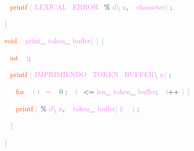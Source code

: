 \documentclass[8, usernames, dvipsnames]{beamer}
\begin{document}
\begin{frame}
\textcolor{White}{\   }
\textcolor{OrangeRed}{printf}
\textcolor{SkyBlue}{(}
\textcolor{Violet}{LEXICAL}\textcolor{White}{\ }
\textcolor{Violet}{ERROR}\textcolor{White}{\ }
\textcolor{Apricot}{\%}
\textcolor{Violet}{d}\textcolor{Gray}{\textbackslash }
\textcolor{Violet}{n}\textcolor{Sepia}{,}
\textcolor{White}{\ }
\textcolor{Violet}{character}\textcolor{SkyBlue}{)}
\textcolor{Sepia}{;}

 \textcolor{SkyBlue}{\} }

 \textcolor{OrangeRed}{void}
\textcolor{White}{\ }
\textcolor{Violet}{print}\textcolor{Sepia}{\_}
\textcolor{Violet}{token}\textcolor{Sepia}{\_}
\textcolor{Violet}{buffer}\textcolor{SkyBlue}{(}
\textcolor{SkyBlue}{)}
\textcolor{SkyBlue}{\{ }

 \textcolor{White}{\   }
\textcolor{OrangeRed}{int}
\textcolor{White}{\ }
\textcolor{Violet}{i}\textcolor{Sepia}{;}

 \textcolor{White}{\   }
\textcolor{OrangeRed}{printf}
\textcolor{SkyBlue}{(}
\textcolor{Violet}{IMPRIMIENDO}\textcolor{White}{\ }
\textcolor{Violet}{TOKEN}\textcolor{White}{\ }
\textcolor{Violet}{BUFFER}\textcolor{Gray}{\textbackslash }
\textcolor{Violet}{n}\textcolor{SkyBlue}{)}
\textcolor{Sepia}{;}

 \textcolor{White}{\   }
\textcolor{White}{\   }
\textcolor{OrangeRed}{for}
\textcolor{White}{\ }
\textcolor{SkyBlue}{(}
\textcolor{Violet}{i}\textcolor{White}{\ }
\textcolor{Salmon}{=}
\textcolor{White}{\ }
\textcolor{SeaGreen}{0}
\textcolor{Sepia}{;}
\textcolor{White}{\ }
\textcolor{Violet}{i}\textcolor{White}{\ }
\textcolor{OliveGreen}{\textless =}
\textcolor{Violet}{len}\textcolor{Sepia}{\_}
\textcolor{Violet}{token}\textcolor{Sepia}{\_}
\textcolor{Violet}{buffer}\textcolor{Sepia}{;}
\textcolor{White}{\ }
\textcolor{Violet}{i}\textcolor{Apricot}{++}
\textcolor{SkyBlue}{)}
\textcolor{SkyBlue}{\{ }

 \textcolor{White}{\   }
\textcolor{White}{\   }
\textcolor{OrangeRed}{printf}
\textcolor{SkyBlue}{(}
\textcolor{Apricot}{\%}
\textcolor{Violet}{d}\textcolor{Gray}{\textbackslash }
\textcolor{Violet}{n}\textcolor{Sepia}{,}
\textcolor{White}{\ }
\textcolor{Violet}{token}\textcolor{Sepia}{\_}
\textcolor{Violet}{buffer}\textcolor{SkyBlue}{[}
\textcolor{Violet}{i}\textcolor{SkyBlue}{]}
\textcolor{White}{\ }
\textcolor{SkyBlue}{)}
\textcolor{Sepia}{;}

 \textcolor{White}{\   }
\textcolor{SkyBlue}{\} }

 \textcolor{SkyBlue}{\} }

 
 \end{frame}
\end{document}
